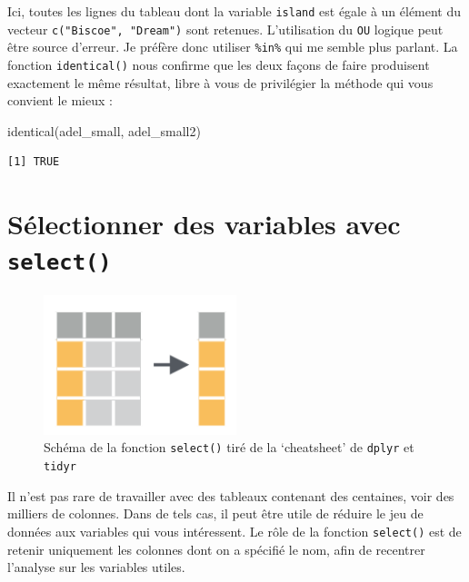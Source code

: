 \documentclass[
  letterpaper,
  DIV=11,
  numbers=noendperiod]{scrreprt}
\newenvironment{Shaded}{\begin{snugshade}}{\end{snugshade}}
\newcommand{\FunctionTok}[1]{\textcolor[rgb]{0.28,0.35,0.67}{#1}}
\newcommand{\NormalTok}[1]{\textcolor[rgb]{0.00,0.23,0.31}{#1}}
\begin{document}
Ici, toutes les lignes du tableau dont la variable \texttt{island} est
égale à un élément du vecteur \texttt{c("Biscoe",\ "Dream")} sont
retenues. L'utilisation du \texttt{OU} logique peut être source
d'erreur. Je préfère donc utiliser \texttt{\%in\%} qui me semble plus
parlant. La fonction \texttt{identical()} nous confirme que les deux
façons de faire produisent exactement le même résultat, libre à vous de
privilégier la méthode qui vous convient le mieux :

\begin{Shaded}
\begin{Highlighting}[]
\FunctionTok{identical}\NormalTok{(adel\_small, adel\_small2)}
\end{Highlighting}
\end{Shaded}

\begin{verbatim}
[1] TRUE
\end{verbatim}

\hypertarget{suxe9lectionner-des-variables-avec-select}{%
\section{\texorpdfstring{Sélectionner des variables avec
\texttt{select()}}{Sélectionner des variables avec select()}}\label{suxe9lectionner-des-variables-avec-select}}

\begin{figure}

{\centering \includegraphics[width=0.5\textwidth,height=\textheight]{./images/select.png}

}

\caption{Schéma de la fonction \texttt{select()} tiré de la `cheatsheet'
de \texttt{dplyr} et \texttt{tidyr}}

\end{figure}

Il n'est pas rare de travailler avec des tableaux contenant des
centaines, voir des milliers de colonnes. Dans de tels cas, il peut être
utile de réduire le jeu de données aux variables qui vous intéressent.
Le rôle de la fonction \texttt{select()} est de retenir uniquement les
colonnes dont on a spécifié le nom, afin de recentrer l'analyse sur les
variables utiles.
\end{document}
